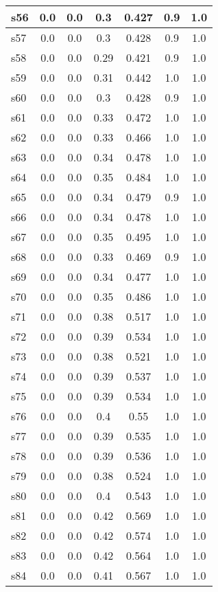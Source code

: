 \documentclass{article}
\begin{document}
\begin{tabular}{|l|c|c|c|c|c|c|}
\hline
s56 &0.0 & 0.0 & 0.3 & 0.427 & 0.9 & 1.0\\
\hline
s57 &0.0 & 0.0 & 0.3 & 0.428 & 0.9 & 1.0\\
\hline
s58 &0.0 & 0.0 & 0.29 & 0.421 & 0.9 & 1.0\\
\hline
s59 &0.0 & 0.0 & 0.31 & 0.442 & 1.0 & 1.0\\
\hline
s60 &0.0 & 0.0 & 0.3 & 0.428 & 0.9 & 1.0\\
\hline
s61 &0.0 & 0.0 & 0.33 & 0.472 & 1.0 & 1.0\\
\hline
s62 &0.0 & 0.0 & 0.33 & 0.466 & 1.0 & 1.0\\
\hline
s63 &0.0 & 0.0 & 0.34 & 0.478 & 1.0 & 1.0\\
\hline
s64 &0.0 & 0.0 & 0.35 & 0.484 & 1.0 & 1.0\\
\hline
s65 &0.0 & 0.0 & 0.34 & 0.479 & 0.9 & 1.0\\
\hline
s66 &0.0 & 0.0 & 0.34 & 0.478 & 1.0 & 1.0\\
\hline
s67 &0.0 & 0.0 & 0.35 & 0.495 & 1.0 & 1.0\\
\hline
s68 &0.0 & 0.0 & 0.33 & 0.469 & 0.9 & 1.0\\
\hline
s69 &0.0 & 0.0 & 0.34 & 0.477 & 1.0 & 1.0\\
\hline
s70 &0.0 & 0.0 & 0.35 & 0.486 & 1.0 & 1.0\\
\hline
s71 &0.0 & 0.0 & 0.38 & 0.517 & 1.0 & 1.0\\
\hline
s72 &0.0 & 0.0 & 0.39 & 0.534 & 1.0 & 1.0\\
\hline
s73 &0.0 & 0.0 & 0.38 & 0.521 & 1.0 & 1.0\\
\hline
s74 &0.0 & 0.0 & 0.39 & 0.537 & 1.0 & 1.0\\
\hline
s75 &0.0 & 0.0 & 0.39 & 0.534 & 1.0 & 1.0\\
\hline
s76 &0.0 & 0.0 & 0.4 & 0.55 & 1.0 & 1.0\\
\hline
s77 &0.0 & 0.0 & 0.39 & 0.535 & 1.0 & 1.0\\
\hline
s78 &0.0 & 0.0 & 0.39 & 0.536 & 1.0 & 1.0\\
\hline
s79 &0.0 & 0.0 & 0.38 & 0.524 & 1.0 & 1.0\\
\hline
s80 &0.0 & 0.0 & 0.4 & 0.543 & 1.0 & 1.0\\
\hline
s81 &0.0 & 0.0 & 0.42 & 0.569 & 1.0 & 1.0\\
\hline
s82 &0.0 & 0.0 & 0.42 & 0.574 & 1.0 & 1.0\\
\hline
s83 &0.0 & 0.0 & 0.42 & 0.564 & 1.0 & 1.0\\
\hline
s84 &0.0 & 0.0 & 0.41 & 0.567 & 1.0 & 1.0\\

\end{tabular}
\end{document}
